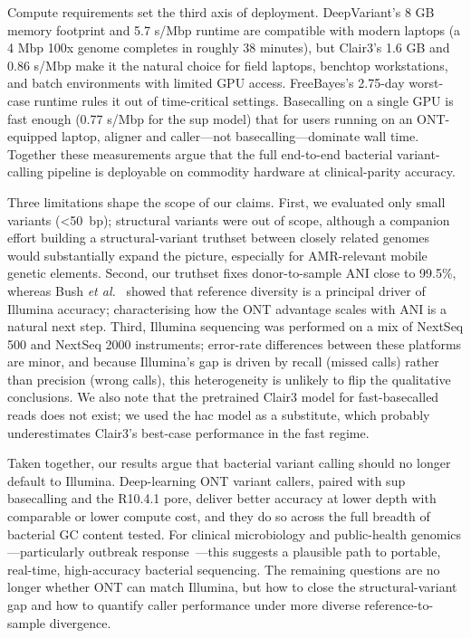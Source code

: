 \documentclass[11pt]{article}
\begin{document}
Compute requirements set the third axis of deployment. DeepVariant's 8 GB memory footprint and 5.7 s/Mbp runtime are compatible with modern laptops (a 4 Mbp 100x genome completes in roughly 38 minutes), but Clair3's 1.6 GB and 0.86 s/Mbp make it the natural choice for field laptops, benchtop workstations, and batch environments with limited GPU access. FreeBayes's 2.75-day worst-case runtime rules it out of time-critical settings. Basecalling on a single GPU is fast enough (0.77 s/Mbp for the sup model) that for users running on an ONT-equipped laptop, aligner and caller---not basecalling---dominate wall time. Together these measurements argue that the full end-to-end bacterial variant-calling pipeline is deployable on commodity hardware at clinical-parity accuracy.

Three limitations shape the scope of our claims. First, we evaluated only small variants (\textless 50~bp); structural variants were out of scope, although a companion effort building a structural-variant truthset between closely related genomes would substantially expand the picture, especially for AMR-relevant mobile genetic elements. Second, our truthset fixes donor-to-sample ANI close to 99.5\%, whereas Bush \emph{et al.}~\citep{bush2020genomic} showed that reference diversity is a principal driver of Illumina accuracy; characterising how the ONT advantage scales with ANI is a natural next step. Third, Illumina sequencing was performed on a mix of NextSeq 500 and NextSeq 2000 instruments; error-rate differences between these platforms are minor, and because Illumina's gap is driven by recall (missed calls) rather than precision (wrong calls), this heterogeneity is unlikely to flip the qualitative conclusions. We also note that the pretrained Clair3 model for fast-basecalled reads does not exist; we used the hac model as a substitute, which probably underestimates Clair3's best-case performance in the fast regime.

Taken together, our results argue that bacterial variant calling should no longer default to Illumina. Deep-learning ONT variant callers, paired with sup basecalling and the R10.4.1 pore, deliver better accuracy at lower depth with comparable or lower compute cost, and they do so across the full breadth of bacterial GC content tested. For clinical microbiology and public-health genomics---particularly outbreak response~\citep{koser2012rapid,didelot2012transforming,quick2016realtime}---this suggests a plausible path to portable, real-time, high-accuracy bacterial sequencing. The remaining questions are no longer whether ONT can match Illumina, but how to close the structural-variant gap and how to quantify caller performance under more diverse reference-to-sample divergence.



\end{document}
